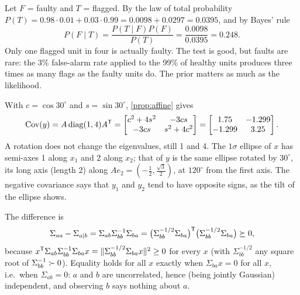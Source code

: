 \begin{solutions}
  \item Let $F$ = faulty and $T$ = flagged. By the law of total probability $P(T) = 0.98\cdot0.01 + 0.03\cdot0.99 = 0.0098 + 0.0297 = 0.0395$, and by
        Bayes' rule
        \[
          P(F\mid T) = \frac{P(T\mid F)P(F)}{P(T)} = \frac{0.0098}{0.0395} = 0.248 .
        \]
        Only one flagged unit in four is actually faulty. The test is good, but faults are rare: the 3\% false-alarm rate applied to the 99\% of
        healthy units produces three times as many flags as the faulty units do. The prior matters as much as the likelihood.

  \item With $c = \cos30^\circ$ and $s = \sin30^\circ$, \cref{prop:affine} gives
        \[
          \operatorname{Cov}(y) = A\operatorname{diag}(1, 4)A^{\mathsf{T}} = \begin{bmatrix} c^2 + 4s^2 & -3cs \\ -3cs & s^2 + 4c^2 \end{bmatrix}
          = \begin{bmatrix} 1.75 & -1.299 \\ -1.299 & 3.25 \end{bmatrix}.
        \]
        A rotation does not change the eigenvalues, still 1 and 4. The $1\sigma$ ellipse of $x$ has semi-axes 1 along $x_1$ and 2 along $x_2$; that
        of $y$ is the same ellipse rotated by $30^\circ$, its long axis (length 2) along $Ae_2 = (-\tfrac12, \tfrac{\sqrt3}{2})$, at $120^\circ$ from the
        first axis. The negative covariance says that $y_1$ and $y_2$ tend to have opposite signs, as the tilt of the ellipse shows.

  \item The difference is
        \[
          \Sigma_{aa} - \Sigma_{a|b} = \Sigma_{ab}\Sigma_{bb}^{-1}\Sigma_{ba} = \big(\Sigma_{bb}^{-1/2}\Sigma_{ba}\big)^{\mathsf{T}}\big(\Sigma_{bb}^{-1/2}\Sigma_{ba}\big) \succeq 0,
        \]
        because $x^{\mathsf{T}}\Sigma_{ab}\Sigma_{bb}^{-1}\Sigma_{ba}x = \|\Sigma_{bb}^{-1/2}\Sigma_{ba}x\|^2 \ge 0$ for every $x$ (with $\Sigma_{bb}^{-1/2}$ any square root of
        $\Sigma_{bb}^{-1} \succ 0$). Equality holds for all $x$ exactly when $\Sigma_{ba}x = 0$ for all $x$, i.e.\ when $\Sigma_{ab} = 0$: $a$ and $b$ are uncorrelated,
        hence (being jointly Gaussian) independent, and observing $b$ says nothing about $a$.


\end{solutions}

